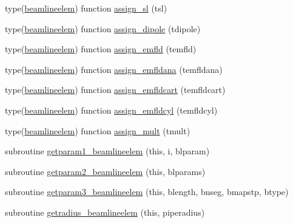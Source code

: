 \begin{DoxyCompactItemize}
\item 
type(\mbox{\hyperlink{namespacebeamlineelemclass_structbeamlineelemclass_1_1beamlineelem}{beamlineelem}}) function \mbox{\hyperlink{namespacebeamlineelemclass_ad06dd33f09db1eab5304ec2a865a4b83}{assign\+\_\+sl}} (tsl)
\item 
type(\mbox{\hyperlink{namespacebeamlineelemclass_structbeamlineelemclass_1_1beamlineelem}{beamlineelem}}) function \mbox{\hyperlink{namespacebeamlineelemclass_ab472ce183e8b1faa6f40c494a9d8bc03}{assign\+\_\+dipole}} (tdipole)
\item 
type(\mbox{\hyperlink{namespacebeamlineelemclass_structbeamlineelemclass_1_1beamlineelem}{beamlineelem}}) function \mbox{\hyperlink{namespacebeamlineelemclass_ac9cc1a9326b192530803d06d2e8b088b}{assign\+\_\+emfld}} (temfld)
\item 
type(\mbox{\hyperlink{namespacebeamlineelemclass_structbeamlineelemclass_1_1beamlineelem}{beamlineelem}}) function \mbox{\hyperlink{namespacebeamlineelemclass_a2cd5ca28bafb3c67cde6af5b0677473f}{assign\+\_\+emfldana}} (temfldana)
\item 
type(\mbox{\hyperlink{namespacebeamlineelemclass_structbeamlineelemclass_1_1beamlineelem}{beamlineelem}}) function \mbox{\hyperlink{namespacebeamlineelemclass_af51b4befb67d269a6d71be8bbd50399b}{assign\+\_\+emfldcart}} (temfldcart)
\item 
type(\mbox{\hyperlink{namespacebeamlineelemclass_structbeamlineelemclass_1_1beamlineelem}{beamlineelem}}) function \mbox{\hyperlink{namespacebeamlineelemclass_a3d349f36feb9724cfcf498e03c191b29}{assign\+\_\+emfldcyl}} (temfldcyl)
\item 
type(\mbox{\hyperlink{namespacebeamlineelemclass_structbeamlineelemclass_1_1beamlineelem}{beamlineelem}}) function \mbox{\hyperlink{namespacebeamlineelemclass_aacf4de73999b66f3e37bf58cda6e562b}{assign\+\_\+mult}} (tmult)
\item 
subroutine \mbox{\hyperlink{namespacebeamlineelemclass_a52595a459a442685b5ab427a2fdb27c8}{getparam1\+\_\+beamlineelem}} (this, i, blparam)
\item 
subroutine \mbox{\hyperlink{namespacebeamlineelemclass_ab0803e0260eb5f57a59a7d1f70cf7050}{getparam2\+\_\+beamlineelem}} (this, blparams)
\item 
subroutine \mbox{\hyperlink{namespacebeamlineelemclass_a0b69da010861c6ca72da3822335a7b2f}{getparam3\+\_\+beamlineelem}} (this, blength, bnseg, bmapstp, btype)
\item 
subroutine \mbox{\hyperlink{namespacebeamlineelemclass_a1ad4e1512d472a585ab03dee9a2f1acb}{getradius\+\_\+beamlineelem}} (this, piperadius)

\end{DoxyCompactItemize}
